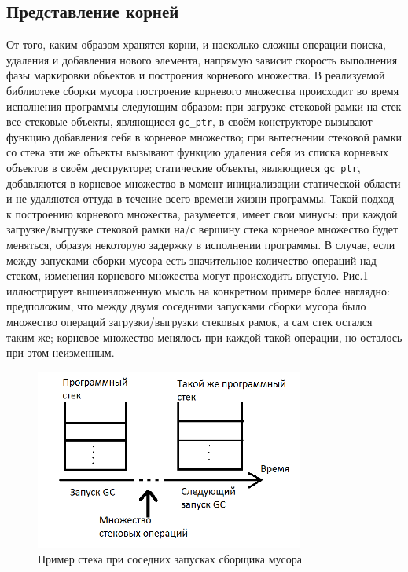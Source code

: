 \subsection{Представление корней}
От того, каким образом хранятся корни, и насколько сложны операции поиска, удаления и добавления нового элемента,
напрямую зависит скорость выполнения фазы маркировки объектов и построения корневого множества.
В реализуемой библиотеке сборки мусора построение корневого множества происходит во время исполнения программы
следующим образом: при загрузке стековой рамки на стек все стековые объекты,
являющиеся \lstinline[language= cpp]{gc_ptr}, в своём конструкторе вызывают функцию добавления себя в корневое множество;
при вытеснении стековой рамки со стека эти же объекты вызывают функцию удаления себя из списка корневых объектов
в своём деструкторе; статические объекты, являющиеся \lstinline[language= cpp]{gc_ptr}, добавляются в корневое множество
в момент инициализации статической области и не удаляются оттуда в течение всего времени жизни программы.
Такой подход к построению корневого множества, разумеется, имеет свои минусы: при каждой загрузке/выгрузке
стековой рамки на/с вершину стека корневое множество будет меняться, образуя некоторую
задержку в исполнении программы. В случае, если между запусками сборки мусора есть значительное количество операций
над стеком, изменения корневого множества могут происходить впустую. Рис.\ref{fig:stackLive} иллюстрирует вышеизложенную мысль
на конкретном примере более наглядно: предположим, что между двумя соседними запусками сборки мусора было множество
операций загрузки/выгрузки стековых рамок, а сам стек остался таким же; корневое множество менялось при каждой такой
операции, но осталось при этом неизменным.

\begin{figure}[h!]
	\centering
	\includegraphics[width=250pt]{Berezun/images/picture1.png}
	\caption{Пример стека при соседних запусках сборщика мусора}
	\label{fig:stackLive}
\end{figure}

